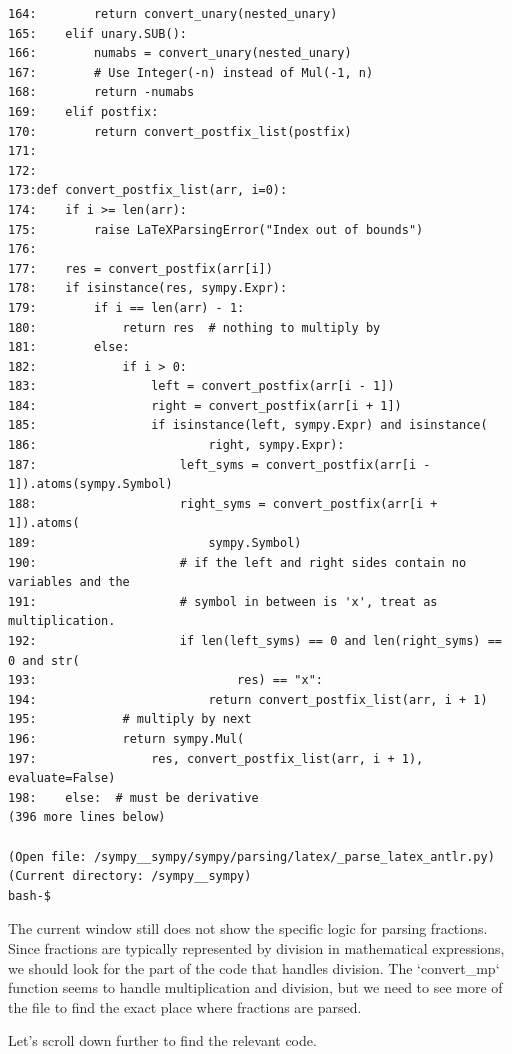 {\begin{observationbox}
\begin{Verbatim}[breaklines=true, breakanywhere=true]
164:        return convert_unary(nested_unary)
165:    elif unary.SUB():
166:        numabs = convert_unary(nested_unary)
167:        # Use Integer(-n) instead of Mul(-1, n)
168:        return -numabs
169:    elif postfix:
170:        return convert_postfix_list(postfix)
171:
172:
173:def convert_postfix_list(arr, i=0):
174:    if i >= len(arr):
175:        raise LaTeXParsingError("Index out of bounds")
176:
177:    res = convert_postfix(arr[i])
178:    if isinstance(res, sympy.Expr):
179:        if i == len(arr) - 1:
180:            return res  # nothing to multiply by
181:        else:
182:            if i > 0:
183:                left = convert_postfix(arr[i - 1])
184:                right = convert_postfix(arr[i + 1])
185:                if isinstance(left, sympy.Expr) and isinstance(
186:                        right, sympy.Expr):
187:                    left_syms = convert_postfix(arr[i - 1]).atoms(sympy.Symbol)
188:                    right_syms = convert_postfix(arr[i + 1]).atoms(
189:                        sympy.Symbol)
190:                    # if the left and right sides contain no variables and the
191:                    # symbol in between is 'x', treat as multiplication.
192:                    if len(left_syms) == 0 and len(right_syms) == 0 and str(
193:                            res) == "x":
194:                        return convert_postfix_list(arr, i + 1)
195:            # multiply by next
196:            return sympy.Mul(
197:                res, convert_postfix_list(arr, i + 1), evaluate=False)
198:    else:  # must be derivative
(396 more lines below)

(Open file: /sympy__sympy/sympy/parsing/latex/_parse_latex_antlr.py)
(Current directory: /sympy__sympy)
bash-$
\end{Verbatim}
\end{observationbox}
\begin{agentbox}
The current window still does not show the specific logic for parsing fractions. Since fractions are typically represented by division in mathematical expressions, we should look for the part of the code that handles division. The `convert\_mp` function seems to handle multiplication and division, but we need to see more of the file to find the exact place where fractions are parsed.



Let's scroll down further to find the relevant code.


\end{agentbox}}

